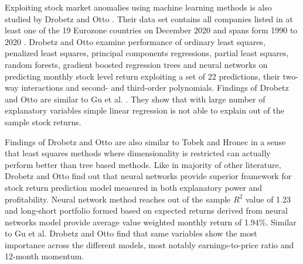 \documentclass{article}
\begin{document}

Exploiting stock market anomalies using machine learning methods is also studied by Drobetz and Otto \citeyear{Drobetz}. Their data set contains all companies listed in at least one of the 19 Eurozone countries on December 2020 and spans form 1990 to 2020 \footnotemark. Drobetz and Otto examine performance of ordinary least squares, penalized least squares, principal components regressions, partial least squares, random forests, gradient boosted regression trees and neural networks on predicting monthly stock level return exploiting a set of 22 predictions, their two-way interactions and second- and third-order polynomials. Findings of Drobetz and Otto are similar to Gu et al. \citeyear{guetal}. They show that with large number of explanatory variables simple linear regression is not able to explain out of the sample stock returns. \par


Findings of Drobetz and Otto \citeyear{Drobetz} are also similar to Tobek and Hronec \citeyear{TOBEK2021100588} in a sense that least squares methods where dimensionality is restricted can actually perform better than tree based methods. Like in majority of other literature, Drobetz and Otto find out that neural networks provide superior framework for stock return prediction model measured in both explanatory power and profitability. Neural network method reaches out of the sample $R^{2}$ value of 1.23 and long-short portfolio formed based on expected returns derived from neural networks model provide average value weighted monthly return of 1.94\%. Similar to Gu et al. \citeyear{guetal} Drobetz and Otto find that same variables show the most importance across the different models, most notably earnings-to-price ratio and 12-month momentum. \par
\end{document}
